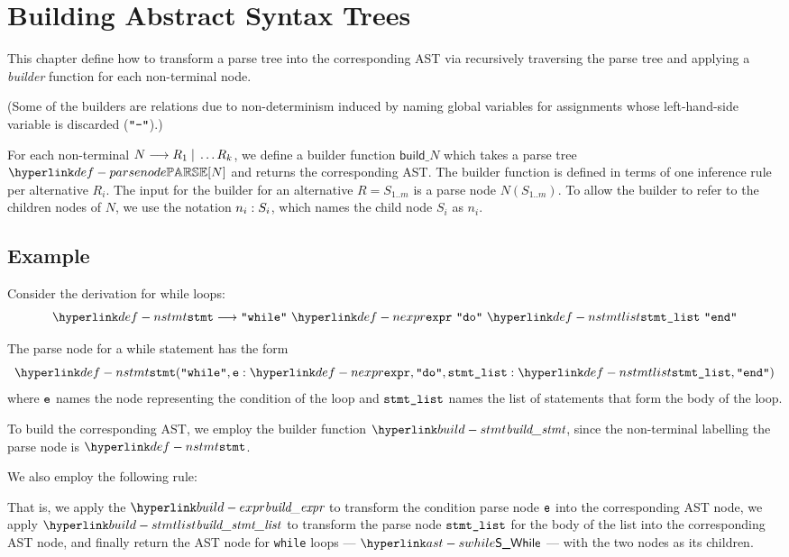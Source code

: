 \chapter{Building Abstract Syntax Trees \label{chap:BuildingAbstractSyntaxTrees}}
This chapter define how to transform a parse tree into the corresponding AST
via recursively traversing the parse tree and applying a \emph{builder} function
for each non-terminal node.

(Some of the builders are relations due to non-determinism induced by naming global variables
for assignments whose left-hand-side variable is discarded ($\Tminus$).)

For each non-terminal $N \derives R_1 \;|\; \ldots R_k$, we define a builder function
$\textsf{build\_}N $ which takes a parse tree $\parsenode{N}$ and returns the corresponding
AST. The builder function is defined in terms of one inference rule per alternative $R_i$.
The input for the builder for an alternative $R = S_{1..m}$ is a parse node
$N(S_{1..m})$. To allow the builder to refer to the children nodes of $N$,
we use the notation $\namednode{n_i}{S_i}$, which names the child node $S_i$ as $n_i$.

\section{Example}
Consider the derivation for while loops:
\[
\Nstmt \derives \Twhile \parsesep \Nexpr \parsesep \Tdo \parsesep \Nstmtlist \parsesep \Tend
\]

The parse node for a while statement has the form
\[
\Nstmt(\Twhile, \namednode{\ve}{\Nexpr}, \Tdo, \namednode{\vstmtlist}{\Nstmtlist}, \Tend)
\]
where $\ve$ names the node representing the condition of the loop and $\vstmtlist$ names
the list of statements that form the body of the loop.

To build the corresponding AST, we employ the builder function $\buildstmt$, since
the non-terminal labelling the parse node is $\Nstmt$.

We also employ the following rule:
\begin{mathpar}
\end{mathpar}
That is, we apply the $\buildexpr$ to transform the condition parse node $\ve$ into the corresponding AST node,
we apply $\buildstmtlist$ to transform the parse node $\vstmtlist$ for the body of the list into the corresponding AST node,
and finally return the AST node for \texttt{while} loops --- $\SWhile$ --- with the two nodes as its children.

